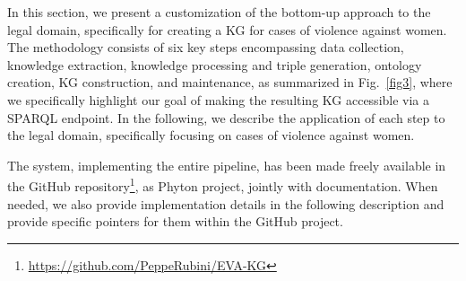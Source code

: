 \documentclass[runningheads]{llncs}
\begin{document}
In this section, we present a customization of the bottom-up approach to the legal domain, specifically for creating 
a KG for cases of violence against women. %
The methodology %
consists of six key steps %
encompassing data collection, %
knowledge extraction, knowledge processing and triple generation, ontology creation, KG construction, and maintenance, as summarized in Fig.~\ref{fig3}, where we specifically highlight our goal of making the resulting KG accessible via a SPARQL endpoint. %
In the following, we describe the application of each step to the legal domain, specifically focusing on cases of violence against women. 

The system, implementing %
the entire pipeline, has been made freely available in the GitHub repository\footnote{\url{https://github.com/PeppeRubini/EVA-KG}}, as Phyton project, jointly with  documentation. When needed, we also provide implementation details in the following description and provide specific pointers for them within the GitHub project. %
\end{document}
